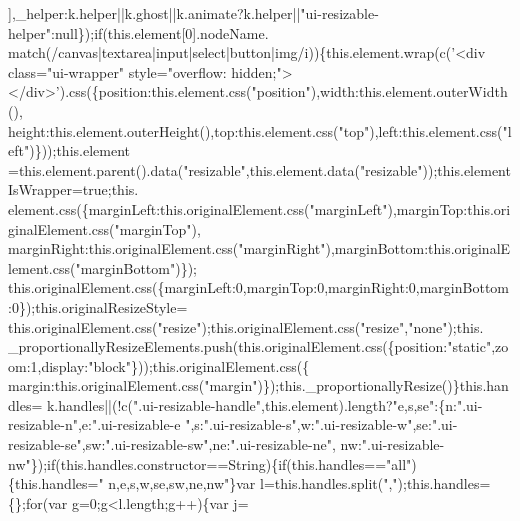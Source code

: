 \begin{DoxyCode}
      ],\_helper:k.helper||k.ghost||k.animate?k.helper||\textcolor{stringliteral}{"ui-resizable-helper"}:null\});\textcolor{keywordflow}{if}(this.element[0].nodeName.
      match(/canvas|textarea|input|select|button|img/i))\{this.element.wrap(c(\textcolor{stringliteral}{'<div class="ui-wrapper"
       style="overflow: hidden;"></div>'}).css(\{position:this.element.css(\textcolor{stringliteral}{"position"}),width:this.element.outerWidth(),
      height:this.element.outerHeight(),top:this.element.css(\textcolor{stringliteral}{"top"}),left:this.element.css(\textcolor{stringliteral}{"left"})\}));this.element
      =this.element.parent().data(\textcolor{stringliteral}{"resizable"},this.element.data(\textcolor{stringliteral}{"resizable"}));this.elementIsWrapper=\textcolor{keyword}{true};this.
      element.css(\{marginLeft:this.originalElement.css(\textcolor{stringliteral}{"marginLeft"}),marginTop:this.originalElement.css(\textcolor{stringliteral}{"marginTop"}),
      marginRight:this.originalElement.css(\textcolor{stringliteral}{"marginRight"}),marginBottom:this.originalElement.css(\textcolor{stringliteral}{"marginBottom"})\});
      this.originalElement.css(\{marginLeft:0,marginTop:0,marginRight:0,marginBottom:0\});this.originalResizeStyle=
      this.originalElement.css(\textcolor{stringliteral}{"resize"});this.originalElement.css(\textcolor{stringliteral}{"resize"},\textcolor{stringliteral}{"none"});this.
      \_proportionallyResizeElements.push(this.originalElement.css(\{position:\textcolor{stringliteral}{"static"},zoom:1,display:\textcolor{stringliteral}{"block"}\}));this.originalElement.css(\{
      margin:this.originalElement.css(\textcolor{stringliteral}{"margin"})\});this.\_proportionallyResize()\}this.handles=
      k.handles||(!c(\textcolor{stringliteral}{".ui-resizable-handle"},this.element).length?\textcolor{stringliteral}{"e,s,se"}:\{n:\textcolor{stringliteral}{".ui-resizable-n"},e:\textcolor{stringliteral}{".ui-resizable-e
      "},s:\textcolor{stringliteral}{".ui-resizable-s"},w:\textcolor{stringliteral}{".ui-resizable-w"},se:\textcolor{stringliteral}{".ui-resizable-se"},sw:\textcolor{stringliteral}{".ui-resizable-sw"},ne:\textcolor{stringliteral}{".ui-resizable-ne"},
      nw:\textcolor{stringliteral}{".ui-resizable-nw"}\});\textcolor{keywordflow}{if}(this.handles.constructor==String)\{\textcolor{keywordflow}{if}(this.handles==\textcolor{stringliteral}{"all"})\{this.handles=\textcolor{stringliteral}{"
      n,e,s,w,se,sw,ne,nw"}\}var l=this.handles.split(\textcolor{stringliteral}{","});this.handles=\{\};\textcolor{keywordflow}{for}(var g=0;g<l.length;g++)\{var j=

\end{DoxyCode}
